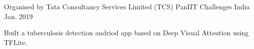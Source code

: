 \begin{cventries}
  \cventry
    {Organised by Tata Consultancy Services Limited (TCS)} %
    {PanIIT Challenges} %
    {India} %
    {Jan. 2019} %
    {
      \begin{cvitems} %
        \item {Built a tuberculosis detection andriod app based on Deep Visual Attention using TFLite.}
      \end{cvitems}
    }


\end{cventries}
